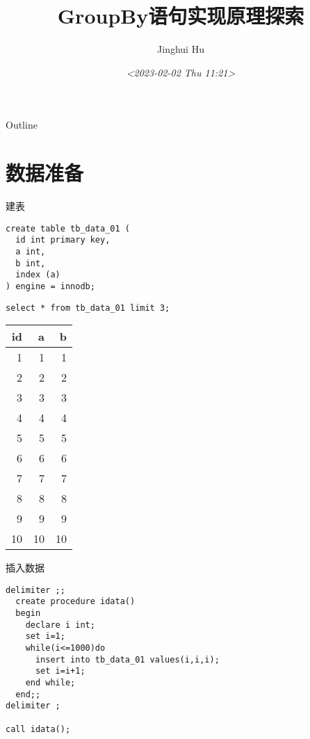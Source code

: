 \documentclass[presentation]{beamer}
\author{Jinghui Hu}
\date{\textit{<2023-02-02 Thu 11:21>}}
\title{GroupBy语句实现原理探索}
\begin{document}
\maketitle
\begin{frame}{Outline}
\tableofcontents
\end{frame}



\section{数据准备}
\label{sec:org027d1c0}
\begin{frame}[label={sec:org9157732},fragile]{建表}
 \begin{verbatim}
create table tb_data_01 (
  id int primary key,
  a int,
  b int,
  index (a)
) engine = innodb;
\end{verbatim}

\begin{verbatim}
select * from tb_data_01 limit 3;
\end{verbatim}

\begin{center}
\begin{tabular}{rrr}
id & a & b\\
\hline
1 & 1 & 1\\
2 & 2 & 2\\
3 & 3 & 3\\
4 & 4 & 4\\
5 & 5 & 5\\
6 & 6 & 6\\
7 & 7 & 7\\
8 & 8 & 8\\
9 & 9 & 9\\
10 & 10 & 10\\
\end{tabular}
\end{center}
\end{frame}
\begin{frame}[label={sec:orge6fda44},fragile]{插入数据}
 \begin{verbatim}
delimiter ;;
  create procedure idata()
  begin
    declare i int;
    set i=1;
    while(i<=1000)do
      insert into tb_data_01 values(i,i,i);
      set i=i+1;
    end while;
  end;;
delimiter ;

call idata();
\end{verbatim}
\end{frame}
\end{document}
